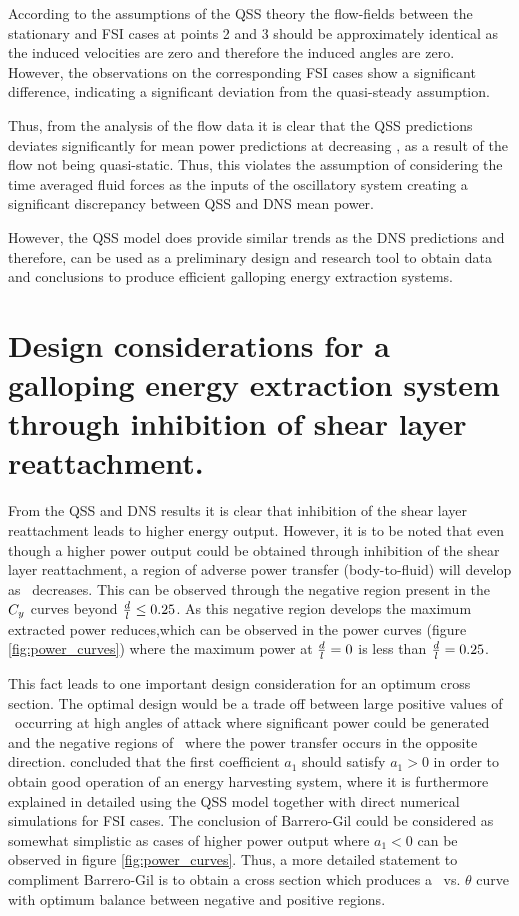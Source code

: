 According to the assumptions of the QSS theory the flow-fields between the stationary and FSI cases at points 2 and 3 should be approximately identical as the induced velocities are zero and therefore the induced angles are zero. However, the observations on the corresponding FSI cases show a significant difference, indicating a significant deviation from the quasi-steady assumption.

Thus, from the analysis of the flow data it is clear that the  QSS predictions deviates significantly for mean power predictions at decreasing \ratio, as a result of the flow not being quasi-static. Thus, this violates the assumption of considering the time averaged fluid forces as the inputs of the oscillatory system creating a significant discrepancy between QSS and DNS mean power.    

 However, the QSS model does provide similar trends as the DNS predictions and therefore, can be used as a preliminary design and research tool to obtain data and conclusions to produce efficient galloping energy extraction systems. 
  
 \section{Design considerations for a galloping energy extraction system through inhibition of shear layer reattachment.}
 \label{subsec:design-considerations-cross-section}
 
 From the QSS and DNS results it is clear that inhibition of the shear layer reattachment  leads to higher energy output. However, it is to be noted that even though a higher power output could be obtained through inhibition of the shear layer reattachment, a region of adverse power transfer (body-to-fluid)  will develop as \ratio\ decreases. This can be observed through the negative region present in the $C_{y}$ curves beyond $\frac{d}{l}\leq0.25$. As this negative region develops the maximum extracted power reduces,which can be observed in the power curves (figure \ref{fig:power_curves}) where the maximum power at $\frac{d}{l}=0$ is less than $\frac{d}{l}=0.25$.
 
 This fact leads to one important design consideration for an optimum cross section. The optimal design would be a trade off between large positive values of \cy\ occurring at high angles of attack where significant power could be generated and the negative regions of \cy\ where the power transfer occurs in the opposite direction. \citet{Barrero-Gil2010a} concluded that the first coefficient $a_1$ should satisfy  $a_1>0$ in order to obtain good operation of an energy harvesting system, where it is furthermore explained in detailed using the QSS model together with direct numerical simulations for FSI cases. The conclusion of Barrero-Gil could be considered as somewhat simplistic as cases of higher power output where $a_1 < 0$ can be observed in figure \ref{fig:power_curves}. Thus, a more detailed statement to compliment Barrero-Gil is to obtain a cross section which produces a \cy\ vs. $\theta$ curve with optimum balance between negative and positive regions.  
 
